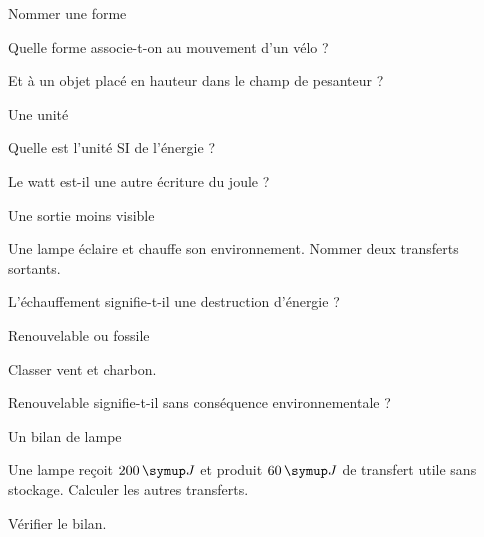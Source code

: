 \par\noindent\begin{minipage}{\linewidth}
\begin{exercice}[1]{Nommer une forme}
\begin{questions}
\item Quelle forme associe-t-on au mouvement d’un vélo ?
\item Et à un objet placé en hauteur dans le champ de pesanteur ?
\end{questions}
\end{exercice}
\end{minipage}
\par\noindent\begin{minipage}{\linewidth}
\begin{exercice}[1]{Une unité}
\begin{questions}
\item Quelle est l’unité SI de l’énergie ?
\item Le watt est-il une autre écriture du joule ?
\end{questions}
\end{exercice}
\end{minipage}
\par\noindent\begin{minipage}{\linewidth}
\begin{exercice}[1]{Une sortie moins visible}
\begin{questions}
\item Une lampe éclaire et chauffe son environnement. Nommer deux transferts sortants.
\item L’échauffement signifie-t-il une destruction d’énergie ?
\end{questions}
\end{exercice}
\end{minipage}
\par\noindent\begin{minipage}{\linewidth}
\begin{exercice}[1]{Renouvelable ou fossile}
\begin{questions}
\item Classer vent et charbon.
\item Renouvelable signifie-t-il sans conséquence environnementale ?
\end{questions}
\end{exercice}
\end{minipage}
\clearpage{}
\par\noindent\begin{minipage}{\linewidth}
\begin{exercice}[2]{Un bilan de lampe}
\begin{questions}
\item Une lampe reçoit $200\unite J$ et produit $60\unite J$ de transfert utile sans stockage. Calculer les autres transferts.
\item Vérifier le bilan.
\end{questions}
\end{exercice}
\end{minipage}
